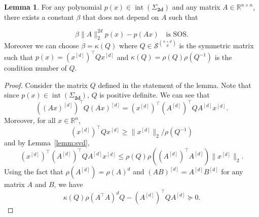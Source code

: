\documentclass{sig-alternate-05-2015}
\DeclareMathOperator{\inte}{int}
\newcommand{\1}{\mathbf{1}}
\newcommand{\ld}[1]{{#1}^{[d]}}
\newcommand{\Sh}{\Sigma_{\mathbf{2d}}}
\theoremstyle{definition}
\newtheorem{mylemm}{Lemma}
\newcommand{\R}{\mathbb{R}}
\newcommand{\Rn}{\R^n}
\newcommand{\Rnn}{\R^{n \times n}}
\newcommand{\Tr}{\top}
\begin{document}
\begin{mylemm}
  \label{lemm:sosbound}
  For any polynomial $p(x) \in \inte(\Sh)$ and any matrix $A \in \Rnn$, there exists a constant $\beta$ that does not depend on $A$
  such that

  \[ \beta\|A\|_2^{2d} p(x) - p(Ax) \quad \text{is SOS}. \]
  Moreover we can choose $\beta = \kappa(Q)$ where $Q \in \mathcal{S}^{{n+d \choose d}}$
  is the symmetric matrix such that $p(x) = (x^{[d]})^\Tr Qx^{[d]}$
  and $\kappa(Q) = \rho(Q) \rho(Q^{-1})$ is the condition number of $Q$.
  \begin{proof}
    Consider the matrix $Q$ defined in the statement of the lemma.
    Note that since $p(x) \in \inte(\Sh)$, $Q$ is positive definite.
    We can see that
    \[ ((Ax)^{[d]})^\Tr Q(Ax)^{[d]} = (\ld{x})^\Tr (A^{[d]})^\Tr Q\ld{A}\ld{x}. \]
    Moreover, for all $x \in \Rn$,
    \[ (\ld{x})^\Tr Q\ld{x} \geq \|\ld{x}\|_2/\rho(Q^{-1}) \]
    and by Lemma~\ref{lemm:svd},
    \[ (\ld{x})^\Tr (A^{[d]})^\Tr Q\ld{A}\ld{x} \leq \rho(Q)\rho((\ld{A})^\Tr \ld{A})\|\ld{x}\|_2. \]
    Using the fact that $\rho(A^{[d]}) = \rho(A)^d$ and $(AB)^{[d]} = A^{[d]}B^{[d]}$ for any matrix $A$ and $B$,
    we have
    \[ \kappa(Q) \rho(A^\Tr A)^{d} Q - (A^{[d]})^\Tr QA^{[d]} \succeq 0. \]
  \end{proof}
\end{mylemm}
\end{document}
